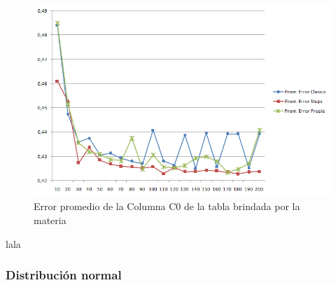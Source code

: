 \begin{itemize}
\begin{figure}[H]
	  \begin{center}
	    \includegraphics[scale=.80]{imagenes/parametroVariableC0Greater.png}
	    \caption{Error promedio de la Columna C0 de la tabla brindada por la materia} 
	    \label{fig:C0_variando_parametro_greater}
	  \end{center}
\end{figure}

\quad lala \\

\end{itemize}

\subsubsection{Distribuci\'on normal}

